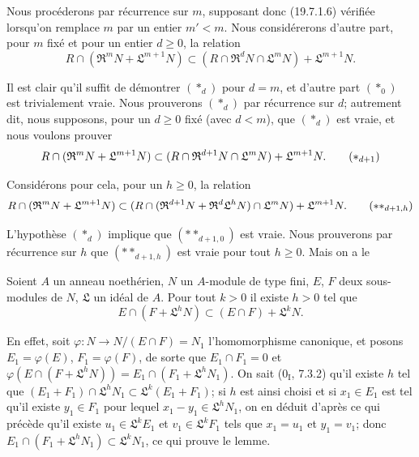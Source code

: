 
Nous procéderons par récurrence sur $m$, supposant donc (19.7.1.6) vérifiée lorsqu'on remplace $m$ par un entier $m'<m$. Nous considérerons d'autre part, pour $m$ fixé et pour un entier $d\geq0$, la relation
\begin{equation}
  R\cap(\mathfrak R^mN+\mathfrak L^{m+1}N)\subset(R\cap\mathfrak R^dN\cap\mathfrak L^mN)+\mathfrak L^{m+1}N.
  \tag{$*_d$}
\end{equation}

Il est clair qu'il suffit de démontrer $(*_d)$ pour $d=m$, et d'autre part $(*_0)$ est trivialement vraie. Nous prouverons $(*_d)$ par récurrence sur $d$; autrement dit, nous supposons, pour un $d\geq0$ fixé (avec $d<m$), que $(*_d)$ est vraie, et nous voulons prouver
\begin{equation}
  R\cap(\mathfrak R^mN+\mathfrak L^{m+1}N)\subset(R\cap\mathfrak R^{d+1}N\cap\mathfrak L^mN)+\mathfrak L^{m+1}N.
  \tag{$*_{d+1}$}
\end{equation}

Considérons pour cela, pour un $h\geq0$, la relation
\begin{equation}
  R\cap(\mathfrak R^mN+\mathfrak L^{m+1}N)\subset(R\cap(\mathfrak R^{d+1}N+\mathfrak R^d\mathfrak L^hN)\cap\mathfrak L^mN)+\mathfrak L^{m+1}N.
  \tag{$**_{d+1,h}$}
\end{equation}

L'hypothèse $(*_d)$ implique que $(**_{d+1,0})$ est vraie. Nous prouverons par récurrence sur $h$ que $(**_{d+1,h})$ est vraie pour tout $h\geq0$. Mais on a le

\begin{lemma}[19.7.1.7]
\label{IV.19.7.1.7}
Soient $A$ un anneau noethérien, $N$ un $A$-module de type fini, $E$, $F$ deux sous-modules de $N$, $\mathfrak L$ un idéal de $A$. Pour tout $k>0$ il existe $h>0$ tel que
\[
  E\cap(F+\mathfrak L^hN)\subset(E\cap F)+\mathfrak L^kN.
\]
\end{lemma}

En effet, soit $\varphi:N\to N/(E\cap F)=N_1$ l'homomorphisme canonique, et posons $E_1=\varphi(E)$, $F_1=\varphi(F)$, de sorte que $E_1\cap F_1=0$ et $\varphi(E\cap(F+\mathfrak L^hN))=E_1\cap(F_1+\mathfrak L^hN_1)$. On sait ($0_{\mathrm I}$, 7.3.2) qu'il existe $h$ tel que $(E_1+F_1)\cap\mathfrak L^hN_1\subset\mathfrak L^k(E_1+F_1)$; si $h$ est ainsi choisi et si $x_1\in E_1$ est tel qu'il existe $y_1\in F_1$ pour lequel $x_1-y_1\in\mathfrak L^hN_1$, on en déduit d'après ce qui précède qu'il existe $u_1\in\mathfrak L^kE_1$ et $v_1\in\mathfrak L^kF_1$ tels que $x_1=u_1$ et $y_1=v_1$; donc $E_1\cap(F_1+\mathfrak L^hN_1)\subset\mathfrak L^kN_1$, ce qui prouve le lemme.

